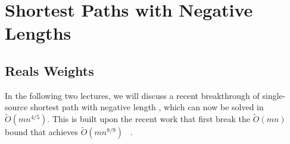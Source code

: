 \section{Shortest Paths with Negative Lengths}
\subsection{Reals Weights}
In the following two lectures, we will discuss a recent breakthrough of single-source shortest path with negative length \cite{huang2024fastersinglesourceshortestpaths}, which can now be solved in \(\widetilde{O} (mn^{4 / 5})\). This is built upon the recent work that first break the \(\widetilde{O} (mn)\) bound that achieves \(\widetilde{O} (mn^{8 / 9})\) ~\cite{fineman2024single}.

